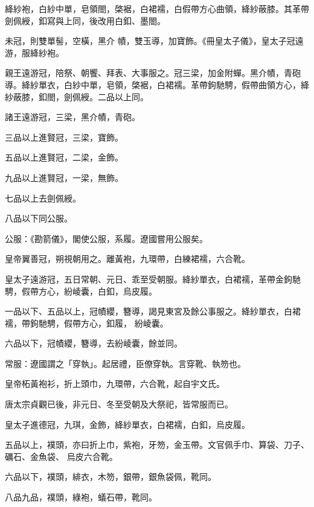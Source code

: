 \begin{pinyinscope}
 絳紗袍，白紗中單，皂領閤，棨裾，白裙襦，白假帶方心曲領，絳紗蔽膝。其革帶劍佩綬，釦寫與上同，後改用白釦、墨閤。



 未冠，則雙單髻，空橫，黑介
 幘，雙玉導，加寶飾。《冊皇太子儀》，皇太子冠遠游，服絳紗袍。



 親王遠游冠，陪祭、朝饗、拜表、大事服之。冠三梁，加金附蟬。黑介幘，青砲導。絳紗單衣，白紗中單，皂領，棨裾，白裙襦。革帶鉤馳騁，假帶曲領方心，絳紗蔽膝，釦閤，劍佩綬。二品以上同。



 諸王遠游冠，三梁，黑介幘，青砲。



 三品以上進賢冠，三梁，寶飾。



 五品以上進賢冠，二梁，金飾。



 九品以上進賢冠，一梁，無飾。



 七品以上去劍佩綬。



 八品以下同公服。



 公服：《勘箭儀》，閣使公服，系履。遼國嘗用公服矣。



 皇帝翼善冠，朔視朝用之。離黃袍，九環帶，白練裙襦，六合靴。



 皇太子遠游冠，五日常朝、元日、乖至受朝服。絳紗單衣，白裙襦，革帶金鉤馳騁，假帶方心，紛崚囊，白釦，烏皮履。



 一品以下、五品以上，冠幘纓，簪導，謁見東宮及餘公事服之。絳紗單衣，白裙襦，帶鉤馳騁，假帶方心，釦履，
 紛崚囊。



 六品以下，冠幘纓，簪導，去紛崚囊，餘並同。



 常服：遼國謂之「穿執」。起居禮，臣僚穿執。言穿靴、執笏也。



 皇帝柘黃袍衫，折上頭巾，九環帶，六合靴，起自宇文氏。



 唐太宗貞觀已後，非元日、冬至受朝及大祭祀，皆常服而已。



 皇太子進德冠，九琪，金飾，絳紗單衣，白裙襦，白釦，烏皮履。



 五品以上，襆頭，亦曰折上巾，紫袍，牙笏，金玉帶。文官佩手巾、算袋、刀子、礪石、金魚袋、
 烏皮六合靴。



 六品以下，襆頭，緋衣，木笏，銀帶，銀魚袋佩，靴同。



 八品九品，襆頭，綠袍，蟻石帶，靴同。



\end{pinyinscope}